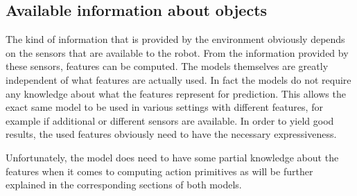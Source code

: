 %

\subsection{Available information about objects}

The kind of information that is provided by the environment obviously depends on the sensors that are available to the robot. From the information provided by these sensors, features can be computed. The models themselves are greatly independent of what features are actually used. In fact the models do not require any knowledge about what the features represent for prediction. This allows the exact same model to be used in various settings with different features, for example if additional or different sensors are available. In order to yield good results, the used features obviously need to have the necessary expressiveness.

Unfortunately, the model does need to have some partial knowledge about the features when it comes to computing action primitives as will be further explained in the corresponding sections of both models.

